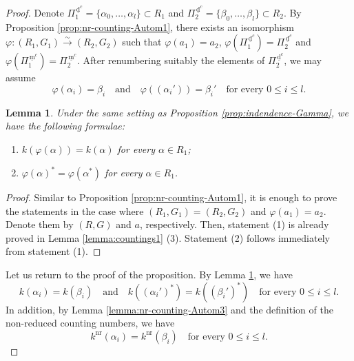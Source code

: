 \documentclass[11pt]{amsart}
\newcommand{\nr}{\mathrm{nr}}
\newcommand{\dc}{\,\underline{\mathrm{d}}^c}
\newcommand{\mc}{\, \underline{\mathrm{m}}^c}
\newtheorem{lemma}[thm]{Lemma}%
\begin{document}
{\begin{proof}
Denote $\Pi^{\dc}_1=\{\alpha_0,\ldots,\alpha_l\}\subset R_1$ and 
$\Pi_2^{\dc}=\{\beta_0,\ldots,\beta_l\}\subset R_2$. 
By Proposition \ref{prop:nr-counting-Autom1}, there exists an isomorphism
$\varphi:(R_1,G_1)\xrightarrow{\sim}(R_2,G_2)$ such that 
$\varphi(a_1)=a_2$, $\varphi(\Pi_1^{\dc})=\Pi_2^{\dc}$ and 
$\varphi(\Pi_1^{\mc})=\Pi_2^{\mc}$. 
After renumbering suitably the elements of $\Pi_2^{\dc}$, 
we may assume
\[\varphi(\alpha_i)=\beta_i\quad\text{and}\quad 
\varphi((\alpha_i'))=\beta_i'\quad\text{for every }0\leq i\leq l.\]
\begin{lemma}\label{lemma:countings1-isom}
Under the same setting as Proposition \ref{prop:indendence-Gamma}, we have
the following formulae{\rm :}
\begin{enumerate}
\item $k(\varphi(\alpha))=k(\alpha)$ for every $\alpha\in R_1${\rm ;}
\vskip 1mm
\item $\varphi(\alpha)^\ast=\varphi(\alpha^\ast)$ for every  $\alpha\in R_1$.
\end{enumerate}
\end{lemma}
\begin{proof}
Similar to Proposition \ref{prop:nr-counting-Autom1}, it is enough to prove
the statements in the case where $(R_1,G_1)=(R_2,G_2)$  and $\varphi(a_1)=a_2$.
Denote them by $(R,G)$ and $a$, respectively. Then, 
statement (1) is already proved in 
Lemma \ref{lemma:countings1} (3). Statement (2) follows immediately from
statement (1). 
\end{proof}

Let us return to the proof of the proposition. By Lemma \ref{lemma:countings1-isom}, 
we have
\begin{equation}\label{equality-countings1}
k(\alpha_i)=k(\beta_i)\quad \text{and} \quad 
k((\alpha_i')^\ast)=k((\beta_i')^\ast)\quad \text{for every }
0\leq i\leq l.
\end{equation}
In addition, by Lemma \ref{lemma:nr-counting-Autom3} and the definition of
the non-reduced counting numbers, we have
\begin{equation}\label{equality-countings2}
k^{\nr}(\alpha_i)=k^{\nr}(\beta_i)\quad \text{for every }
0\leq i\leq l.
\end{equation}


\end{proof}}
\end{document}
